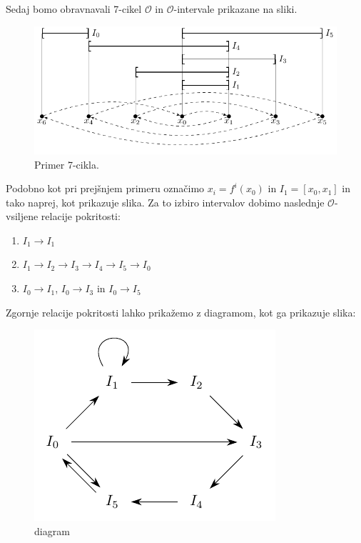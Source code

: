 \documentclass[mat2]{fmfdelo}
\begin{document}
\begin{primer}[7-cikel] \label{primer2}
Sedaj bomo obravnavali 7-cikel $\mathcal{O}$ in $\mathcal{O}$-intervale prikazane na sliki.
\begin{figure}[h]
  \centering
  \includegraphics{images/sedemcikel.pdf}
  \caption[Primer vektorske slike.]{Primer 7-cikla.}
  \label{fig:7cikel}
\end{figure}
 Podobno kot pri prejšnjem primeru označimo $x_i = f^i(x_0)$ in $I_1 = [x_0, x_1]$ in tako naprej, kot prikazuje slika. Za to izbiro intervalov dobimo naslednje $\mathcal{O}$-vsiljene relacije pokritosti:
\begin{enumerate}
\item $I_1 \to I_1$
\item $I_1 \to I_2 \to I_3 \to I_4 \to I_5 \to I_0$
\item $I_0 \to I_1$, $I_0 \to I_3$ in $I_0 \to I_5$
\end{enumerate}
Zgornje relacije pokritosti lahko prikažemo z diagramom, kot ga prikazuje slika:
\begin{figure}[h]
  \centering
  \includegraphics{images/graph6.pdf}
  \caption[Primer vektorske slike.]{diagram}
  \label{fig:6kotnik}
\end{figure}

\end{primer}
\end{document}

